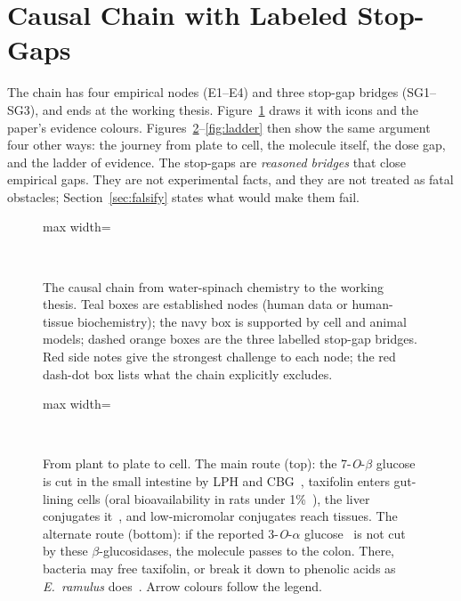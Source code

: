 \documentclass[11pt,a4paper]{article}
\begin{document}
\section{Causal Chain with Labeled Stop-Gaps}
\label{sec:chain}

The chain has four empirical nodes (E1--E4) and three stop-gap bridges (SG1--SG3), and ends at the working thesis. Figure~\ref{fig:chain} draws it with icons and the paper's evidence colours. Figures~\ref{fig:pathway}--\ref{fig:ladder} then show the same argument four other ways: the journey from plate to cell, the molecule itself, the dose gap, and the ladder of evidence. The stop-gaps are \emph{reasoned bridges} that close empirical gaps. They are not experimental facts, and they are not treated as fatal obstacles; Section~\ref{sec:falsify} states what would make them fail.

\begin{figure}[tbp]
\centering
\begin{adjustbox}{max width=\linewidth}\end{adjustbox}\\[4pt]
\evlegend
\caption{The causal chain from water-spinach chemistry to the working thesis. Teal boxes are established nodes (human data or human-tissue biochemistry); the navy box is supported by cell and animal models; dashed orange boxes are the three labelled stop-gap bridges. Red side notes give the strongest challenge to each node; the red dash-dot box lists what the chain explicitly excludes.}
\label{fig:chain}
\end{figure}

\begin{figure}[tbp]
\centering
\begin{adjustbox}{max width=\linewidth}\end{adjustbox}\\[4pt]
\evlegend
\caption{From plant to plate to cell. The main route (top): the 7-\emph{O}-$\beta$ glucose is cut in the small intestine by LPH and CBG~\cite{day1998,day2000,nemeth2003}, taxifolin enters gut-lining cells (oral bioavailability in rats under 1\%~\cite{yang2016,shi2020}), the liver conjugates it~\cite{kroon2004,manach2005}, and low-micromolar conjugates reach tissues. The alternate route (bottom): if the reported 3-\emph{O}-$\alpha$ glucose~\cite{prasad2005} is not cut by these $\beta$-glucosidases, the molecule passes to the colon. There, bacteria may free taxifolin, or break it down to phenolic acids as \emph{E.~ramulus} does~\cite{braune2001}. Arrow colours follow the legend.}
\label{fig:pathway}
\end{figure}
\end{document}
